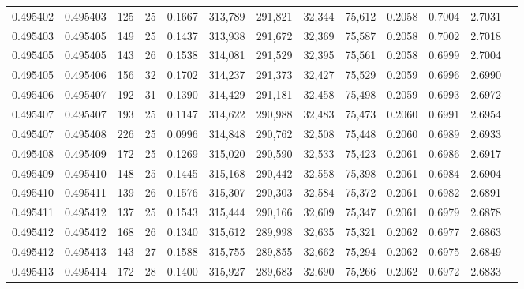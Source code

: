 \begin{tabular}{rrrrrrrrrrrrr}
0.495402 & 0.495403 & 125 &  25 &                                     0.1667 & 313,789 & 291,821 &  32,344 &  75,612 & 0.2058 & 0.7004 & 2.7031 \\
0.495403 & 0.495405 & 149 &  25 &                                     0.1437 & 313,938 & 291,672 &  32,369 &  75,587 & 0.2058 & 0.7002 & 2.7018 \\
0.495405 & 0.495405 & 143 &  26 &                                     0.1538 & 314,081 & 291,529 &  32,395 &  75,561 & 0.2058 & 0.6999 & 2.7004 \\
0.495405 & 0.495406 & 156 &  32 &                                     0.1702 & 314,237 & 291,373 &  32,427 &  75,529 & 0.2059 & 0.6996 & 2.6990 \\
0.495406 & 0.495407 & 192 &  31 &                                     0.1390 & 314,429 & 291,181 &  32,458 &  75,498 & 0.2059 & 0.6993 & 2.6972 \\
0.495407 & 0.495407 & 193 &  25 &                                     0.1147 & 314,622 & 290,988 &  32,483 &  75,473 & 0.2060 & 0.6991 & 2.6954 \\
0.495407 & 0.495408 & 226 &  25 &                                     0.0996 & 314,848 & 290,762 &  32,508 &  75,448 & 0.2060 & 0.6989 & 2.6933 \\
0.495408 & 0.495409 & 172 &  25 &                                     0.1269 & 315,020 & 290,590 &  32,533 &  75,423 & 0.2061 & 0.6986 & 2.6917 \\
0.495409 & 0.495410 & 148 &  25 &                                     0.1445 & 315,168 & 290,442 &  32,558 &  75,398 & 0.2061 & 0.6984 & 2.6904 \\
0.495410 & 0.495411 & 139 &  26 &                                     0.1576 & 315,307 & 290,303 &  32,584 &  75,372 & 0.2061 & 0.6982 & 2.6891 \\
0.495411 & 0.495412 & 137 &  25 &                                     0.1543 & 315,444 & 290,166 &  32,609 &  75,347 & 0.2061 & 0.6979 & 2.6878 \\
0.495412 & 0.495412 & 168 &  26 &                                     0.1340 & 315,612 & 289,998 &  32,635 &  75,321 & 0.2062 & 0.6977 & 2.6863 \\
0.495412 & 0.495413 & 143 &  27 &                                     0.1588 & 315,755 & 289,855 &  32,662 &  75,294 & 0.2062 & 0.6975 & 2.6849 \\
0.495413 & 0.495414 & 172 &  28 &                                     0.1400 & 315,927 & 289,683 &  32,690 &  75,266 & 0.2062 & 0.6972 & 2.6833 \\

\end{tabular}
